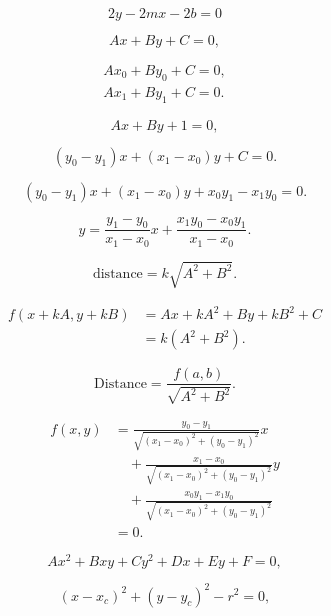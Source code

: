 \documentclass[lang=cn,12pt]{elegantbook}
\begin{document}
$$
  2y-2mx-2b=0
$$

\begin{equation}
  Ax+By+C=0,
\end{equation}

$$
  \begin{array}{c}{{A x_{0}+B y_{0}+C=0,}}\\ {{A x_{1}+B y_{1}+C=0.}}\end{array}
$$

$$
  Ax+By+1=0,
$$

\begin{equation}
  (y_{0}-y_{1})x+(x_{1}-x_{0})y+C=0.
\end{equation}

\begin{equation}
  (y_{0}-y_{1})x+(x_{1}-x_{0})y+x_{0}y_{1}-x_{1}y_{0}=0.
\end{equation}

$$
  y={\frac{y_{1}-y_{0}}{x_{1}-x_{0}}}x+{\frac{x_{1}y_{0}-x_{0}y_{1}}{x_{1}-x_{0}}}.
$$

\begin{equation}
  \mathrm{distance}=k\sqrt{A^{2}+B^{2}}.
\end{equation}

\begin{equation}
  \begin{aligned}
    f(x+k A,y+k B) & =A x+k A^{2}+B y+k B^{2}+C \\
                   & =k(A^{2}+B^{2}).
  \end{aligned}
\end{equation}

$$
  \mathrm{Distance}={\frac{f(a,b)}{\sqrt{A^{2}+B^{2}}}}.
$$

\begin{equation}
  \begin{aligned}
    f(x,y) & ={\frac{y_{0}-y_{1}}{\sqrt{(x_{1}-x_{0})^{2}+(y_{0}-y_{1})^{2}}}}x               \\
           & \quad+{\frac{x_{1}-x_{0}}{\sqrt{(x_{1}-x_{0})^{2}+(y_{0}-y_{1})^{2}}}}y          \\
           & \quad+{\frac{x_{0}y_{1}-x_{1}y_{0}}{\sqrt{(x_{1}-x_{0})^{2}+(y_{0}-y_{1})^{2}}}} \\
           & =0.
  \end{aligned}
\end{equation}

$$
  A x^{2}+B x y+C y^{2}+D x+E y+F=0,
$$

$$
  (x-x_{c})^{2}+(y-y_{c})^{2}-r^{2}=0,
$$
\end{document}
